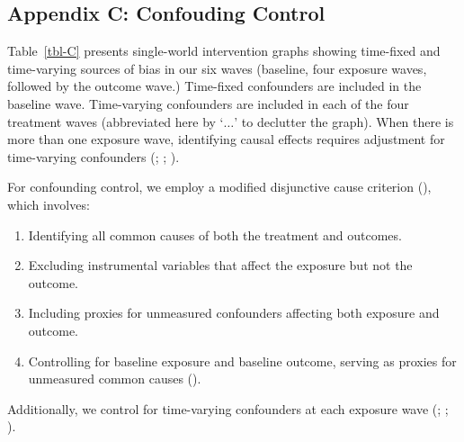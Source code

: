 \documentclass[
  single column]{article}
\providecommand{\tightlist}{%
  \setlength{\itemsep}{0pt}\setlength{\parskip}{0pt}}\usepackage{longtable,booktabs,array}
\begin{document}
\begin{longtable}[t]{lll}
\end{longtable}

\endgroup{}
\endgroup{}

\newpage{}

\subsection{Appendix C: Confouding Control}\label{appendix-confounding}

\begin{table}

\caption{\label{tbl-C}Table~\ref{tbl-C} presents single-world
intervention graphs showing time-fixed and time-varying sources of bias
in our six waves (baseline, four exposure waves, followed by the outcome
wave.) Time-fixed confounders are included in the baseline wave.
Time-varying confounders are included in each of the four treatment
waves (abbreviated here by `\(\dots\)' to declutter the graph). When
there is more than one exposure wave, identifying causal effects
requires adjustment for time-varying confounders
(;
;
).}

\centering{

\tvtable

}

\end{table}%

For confounding control, we employ a modified disjunctive cause
criterion (), which
involves:

\begin{enumerate}
\def\labelenumi{\arabic{enumi}.}
\tightlist
\item
  Identifying all common causes of both the treatment and outcomes.
\item
  Excluding instrumental variables that affect the exposure but not the
  outcome.
\item
  Including proxies for unmeasured confounders affecting both exposure
  and outcome.
\item
  Controlling for baseline exposure and baseline outcome, serving as
  proxies for unmeasured common causes
  ().
\end{enumerate}

Additionally, we control for time-varying confounders at each exposure
wave (;
;
).
\end{document}
